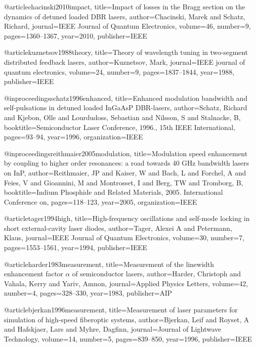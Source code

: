 @article{chacinski2010impact,
  title={Impact of losses in the Bragg section on the dynamics of detuned loaded DBR lasers},
  author={Chacinski, Marek and Schatz, Richard},
  journal={IEEE Journal of Quantum Electronics},
  volume={46},
  number={9},
  pages={1360--1367},
  year={2010},
  publisher={IEEE}
}

@article{kuznetsov1988theory,
  title={Theory of wavelength tuning in two-segment distributed feedback lasers},
  author={Kuznetsov, Mark},
  journal={IEEE journal of quantum electronics},
  volume={24},
  number={9},
  pages={1837--1844},
  year={1988},
  publisher={IEEE}
}

@inproceedings{schatz1996enhanced,
  title={Enhanced modulation bandwidth and self-pulsations in detuned loaded InGaAsP DBR-lasers},
  author={Schatz, Richard and Kjebon, Olle and Lourdudoss, Sebastian and Nilsson, S and Stalnacke, B},
  booktitle={Semiconductor Laser Conference, 1996., 15th IEEE International},
  pages={93--94},
  year={1996},
  organization={IEEE}
}

@inproceedings{reithmaier2005modulation,
  title={Modulation speed enhancement by coupling to higher order resonances: a road towards 40 GHz bandwidth lasers on InP},
  author={Reithmaier, JP and Kaiser, W and Bach, L and Forchel, A and Feies, V and Gioannini, M and Montrosset, I and Berg, TW and Tromborg, B},
  booktitle={Indium Phosphide and Related Materials, 2005. International Conference on},
  pages={118--123},
  year={2005},
  organization={IEEE}
}

@article{tager1994high,
  title={High-frequency oscillations and self-mode locking in short external-cavity laser diodes},
  author={Tager, Alexei A and Petermann, Klaus},
  journal={IEEE Journal of Quantum Electronics},
  volume={30},
  number={7},
  pages={1553--1561},
  year={1994},
  publisher={IEEE}
}

@article{harder1983measurement,
  title={Measurement of the linewidth enhancement factor $\alpha$ of semiconductor lasers},
  author={Harder, Christoph and Vahala, Kerry and Yariv, Amnon},
  journal={Applied Physics Letters},
  volume={42},
  number={4},
  pages={328--330},
  year={1983},
  publisher={AIP}
}

@article{bjerkan1996measurement,
  title={Measurement of laser parameters for simulation of high-speed fiberoptic systems},
  author={Bjerkan, Leif and Royset, A and Hafskjaer, Lars and Myhre, Dagfinn},
  journal={Journal of Lightwave Technology},
  volume={14},
  number={5},
  pages={839--850},
  year={1996},
  publisher={IEEE}
}

